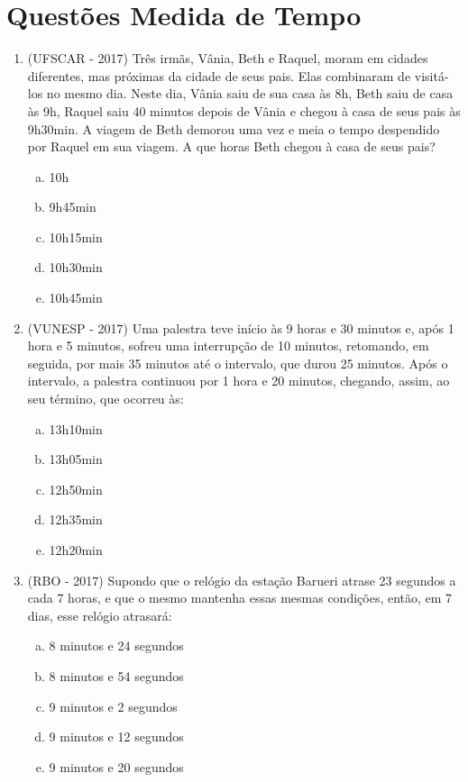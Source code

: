 \section{Questões Medida de Tempo}

\begin{enumerate}[1)]
 \item (UFSCAR - 2017) Três irmãs, Vânia, Beth e Raquel, moram em cidades diferentes, mas próximas da cidade de seus pais. Elas combinaram de visitá-los no mesmo dia. Neste dia, Vânia saiu de sua casa às 8h, Beth saiu de casa às 9h, Raquel saiu 40 minutos depois de Vânia e chegou à casa de seus pais às 9h30min. A viagem de Beth demorou uma vez e meia o tempo despendido por Raquel em sua viagem. A que horas Beth chegou à casa de seus pais? 
 \begin{enumerate}[a)]
 \item 10h
 \item 9h45min
 \item 10h15min
 \item 10h30min
 \item 10h45min
 \end{enumerate}
 
 \item (VUNESP - 2017) Uma palestra teve início às 9 horas e 30 minutos e, após 1 hora e 5 minutos, sofreu uma interrupção de 10 minutos, retomando, em seguida, por mais 35 minutos até o intervalo, que durou 25 minutos. Após o intervalo, a palestra continuou por 1 hora e 20 minutos, chegando, assim, ao seu término, que ocorreu às:
 \begin{enumerate}[a)]
 \item 13h10min
 \item 13h05min
 \item 12h50min
 \item 12h35min
 \item 12h20min
 \end{enumerate}
 
 \item (RBO - 2017) Supondo que o relógio da estação Barueri atrase 23 segundos a cada 7 horas, e que o mesmo mantenha essas mesmas condições, então, em 7 dias, esse relógio atrasará:
 \begin{enumerate}[a)]
 \item 8 minutos e 24 segundos
 \item 8 minutos e 54 segundos
 \item 9 minutos e 2 segundos
 \item 9 minutos e 12 segundos
 \item 9 minutos e 20 segundos
 \end{enumerate}
 

\end{enumerate}
